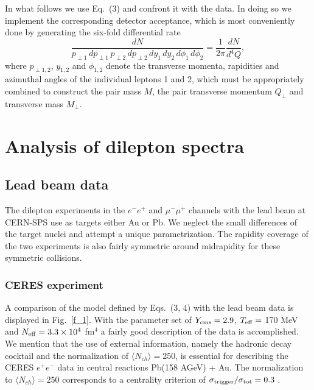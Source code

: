 In what follows we use Eq.~(3) and 
confront it with the data. In doing so we implement the corresponding
detector acceptance, which is most conveniently done by generating the  
six-fold differential rate   
\begin{equation}
\frac{dN}{ p_{\perp 1} \, d p_{\perp 1} \, 
p_{\perp 2} \, d p_{\perp 2} \,
dy_1 \, dy_2 \,
d \phi_1 \, d \phi_2 } %
=
\frac{1}{2 \pi} \frac{dN}{d^4 Q},
\end{equation}
where $p_{\perp 1,2}$, $y_{1,2}$ and $\phi_{1,2}$ denote the transverse
momenta, rapidities and azimuthal angles of the individual leptons 1 and 2,
which must be appropriately combined to construct the pair mass $M$,
the pair transverse momentum $Q_\perp$ and transverse mass $M_\perp$.

\section{Analysis of dilepton spectra} %

\subsection{Lead beam data}

The dilepton experiments in the $e^- e^+$ and $\mu^- \mu^+$ channels 
with the lead beam at CERN-SPS use as targets
either Au or Pb. We neglect the small differences of the target nuclei
and attempt a unique parametrization. The rapidity coverage of the two
experiments is also fairly symmetric around midrapidity
for these symmetric collisions.

\subsubsection{CERES experiment \label{CERES_lead}}

A comparison of the model defined by Eqs.~(3, 4) 
with the lead beam data \cite{CERES_Pb}
is displayed in Fig.~\ref{f_1}. With the parameter set of 
$Y_{\rm cms} = 2.9$,
$T_{\rm eff} =$ 170 MeV and 
$N_{\rm eff} = 3.3 \times 10^4$ fm${}^4$ 
a fairly good description of the data
is accomplished. We mention that the use of 
external information, namely
the hadronic decay cocktail and the normalization of
$\langle N_{ch} \rangle = 250$, is essential for describing the CERES
$e^+ e^-$ data \cite{CERES_Pb} in central reactions Pb(158 AGeV) + Au.
The normalization to $\langle N_{ch} \rangle = 250$ corresponds to
a centrality criterion of 
$\sigma_{\rm trigger} / \sigma_{\rm tot} = 0.3$ \cite{CERES_Pb}.

